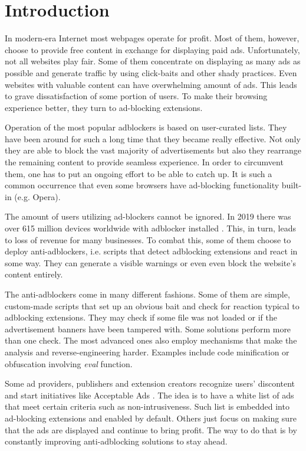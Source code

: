 \chapter*{Introduction}

In modern-era Internet most webpages operate for profit. Most of them, however, choose to provide free content
in exchange for displaying paid ads. Unfortunately, not all websites play fair. Some of them
concentrate on displaying as many ads as possible and generate traffic by using click-baits 
and other shady practices. Even websites with valuable content can have overwhelming amount 
of ads. This leads to grave dissatisfaction of some portion of users. To make their browsing experience better,
they turn to ad-blocking extensions.

Operation of the most popular adblockers is based on user-curated lists. They have been around for such a long
time that they became really effective. Not only they are able to block the vast majority of advertisements
but also they rearrange the remaining content to provide seamless experience.
In order to circumvent them, one has to put an ongoing effort to be able
to catch up. It is such a common occurrence that even some browsers have ad-blocking
functionality built-in (e.g. Opera).

The amount of users utilizing ad-blockers cannot be ignored. In 2019 there was over 615 million devices worldwide
with adblocker installed \cite{pagefair:adblock-report}. This, in turn, leads to loss of revenue for many businesses.
To combat this, some of them choose to deploy anti-adblockers, i.e. scripts that detect adblocking extensions
and react in some way. They can generate a visible warnings or even even block the website's content entirely.

The anti-adblockers come in many different fashions. Some of them are simple, custom-made scripts that 
set up an obvious bait and check for reaction typical to adblocking extensions.
They may check if some file was not loaded or if the advertisement banners have been tampered with.
Some solutions perform more than one check. The most advanced ones also employ mechanisms that
make the analysis and reverse-engineering harder. Examples include code minification
or obfuscation involving \emph{eval} function.

Some ad providers, publishers and extension creators recognize users' discontent 
and start initiatives like Acceptable Ads \cite{acceptableads}.
The idea is to have a white list of ads that meet certain criteria such as non-intrusiveness.
Such list is embedded into ad-blocking extensions and enabled by default.
Others just focus on making sure that the ads are displayed and continue to bring profit.
The way to do that is by constantly improving anti-adblocking solutions to stay ahead.

